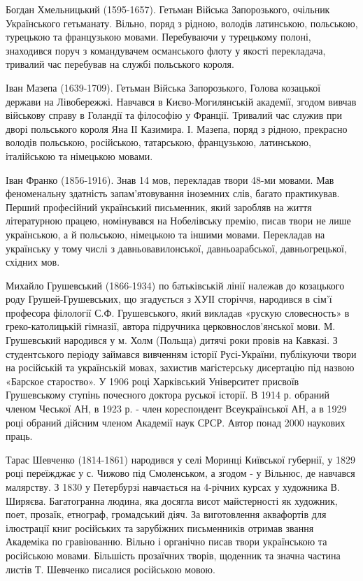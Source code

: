 Богдан Хмельницький (1595-1657). Гетьман  Війська Запорозького, очільник
Українського гетьманату. Вільно, поряд з рідною, володів латинською, польською,
турецькою та французькою мовами. Перебуваючи у турецькому полоні, знаходився
поруч з командувачем османського флоту у якості перекладача, тривалий час
перебував на службі польського короля.

Іван Мазепа (1639-1709). Гетьман Війська Запорозького, Голова козацької держави
на Лівобережжі. Навчався в Києво-Могилянській академії, згодом вивчав військову
справу в Голандії та філософію у Франції. Тривалий час служив при дворі
польського короля Яна ІІ Казимира. І. Мазепа, поряд з рідною, прекрасно володів
польською, російською, татарською, французькою, латинською, італійською та
німецькою мовами.

Іван Франко (1856-1916). Знав 14 мов, перекладав твори 48-ми мовами. Мав
феноменальну здатність запам’ятовування іноземних слів, багато практикував.
Перший професійний український письменник, який заробляв на життя літературною
працею, номінувався на Нобелівську премію, писав твори не лише українською, а й
польською, німецькою та іншими мовами. Перекладав на українську у тому числі з
давньовавилонської, давньоарабської, давньогрецької, східних мов.

Михайло Грушевський (1866-1934) по батьківській лінії належав до козацького
роду Грушей-Грушевських, що згадується з ХУІІ сторіччя, народився в сім’ї
професора філології С.Ф. Грушевського, який викладав «рускую словесность» в
греко-католицькій гімназії, автора підручника церковнослов’янської мови. М.
Грушевський народився у м. Холм (Польща) дитячі роки провів на Кавказі. З
студентського періоду займався вивченням історії Русі-України, публікуючи твори
на російській та українській мовах, захистив магістерську дисертацію під назвою
«Барское староство». У 1906 році Харківський Університет присвоїв Грушевському
ступінь почесного доктора руської історії. В 1914 р. обраний членом Чеської АН,
в 1923 р. - член кореспондент Всеукраїнської АН, а в 1929 році обраний дійсним
членом Академії наук СРСР. Автор понад 2000 наукових праць.

Тарас Шевченко (1814-1861) народився у селі Моринці Київської губернії, у 1829
році переїжджає у с. Чижово під Смоленськом, а згодом - у Вільнюс, де навчався
малярству. З 1830 у Петербурзі навчається на 4-річних курсах у художника В.
Ширяєва. Багатогранна людина, яка досягла висот майстерності як художник, поет,
прозаїк, етнограф, громадський діяч. За виготовлення аквафортів для ілюстрації
книг російських та зарубіжних письменників отримав звання Академіка по
гравіюванню. Вільно і органічно писав твори українською та російською мовами.
Більшість прозаїчних творів, щоденник та значна частина листів Т. Шевченко
писалися російською мовою.

